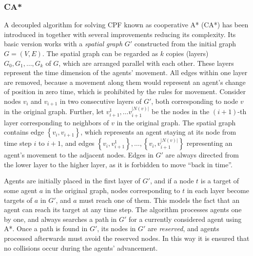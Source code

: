 \subsubsection{CA*}

A decoupled algorithm for solving CPF known as cooperative A* (CA*) has been introduced in \cite{silver05} together with several improvements reducing its complexity.
Its basic version works with a \emph{spatial graph} $G'$ constructed from the initial graph $G=(V, E)$.
The spatial graph can be regarded as $k$ copies (layers) $G_0, G_1,\dots,G_k$ of $G$, which are arranged parallel with each other.
These layers represent the time dimension of the agents' movement.
All edges within one layer are removed, because a movement along them would represent an agent's change of position in zero time, which is prohibited by the rules for movement.
Consider nodes $v_i$ and $v_{i+1}$ in two consecutive layers of $G'$, both corresponding to node $v$ in the original graph.
Further, let $v_{i+1}^1,\dots v_{i+1}^{|N(v)|}$ be the nodes in the $(i+1)$-th layer corresponding to neighbors of $v$ in the original graph.
The spatial graph contains edge $\left\{v_i,v_{i+1}\right\}$, which represents an agent staying at its node from time step $i$ to $i+1$, 
and edges $\left\{v_i,v_{i+1}^{1}\right\},\dots,\left\{v_i,v_{i+1}^{|N(v)|}\right\}$ representing an agent's movement to the adjacent nodes.
Edges in $G'$ are always directed from the lower layer to the higher layer, as it is forbidden to move ``back in time''.

Agents are initially placed in the first layer of $G'$, and if a node $t$ is a target of some agent $a$ in the original graph, nodes corresponding to $t$ in each layer become targets of $a$ in $G'$,
and $a$ must reach one of them.
This models the fact that an agent can reach its target at any time step.
The algorithm processes agents one by one, and always searches a path in $G'$ for a currently considered agent using A*.
Once a path is found in $G'$, its nodes in $G'$ are \emph{reserved}, and agents processed afterwards must avoid the reserved nodes.
In this way it is ensured that no collisions occur during the agents' advancement.

